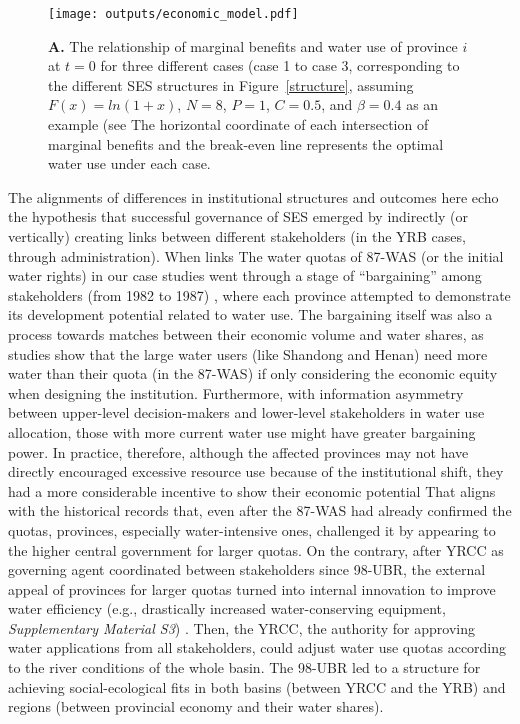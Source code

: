 \begin{figure}[!ht]
    \centering
    \texttt{[image: outputs/economic\_model.pdf]}
	\caption{
		\textbf{A.} The relationship of marginal benefits and water use of province $i$ at $t = 0$ for three different cases (case 1 to case 3, corresponding to the different SES structures in Figure~\ref{structure}, assuming $F(x)=ln(1+x)$, $N=8$, $P=1$, $C=0.5$, and $\beta=0.4$ as an example (see \textit{} The horizontal coordinate of each intersection of marginal benefits and the break-even line represents the optimal water use under each case.}
	\label{fig:model}
\end{figure}

The alignments of differences in institutional structures and outcomes here echo the hypothesis that successful governance of SES emerged by indirectly (or vertically) creating links between different stakeholders (in the YRB cases, through administration).
When links The water quotas of 87-WAS (or the initial water rights) in our case studies went through a stage of ``bargaining'' among stakeholders (from 1982 to 1987) \cite{wang2019a, wang2019d}, where each province attempted to demonstrate its development potential related to water use.
The bargaining itself was also a process towards matches between their economic volume and water shares, as studies show that the large water users (like Shandong and Henan) need more water than their quota (in the 87-WAS) if only considering the economic equity when designing the institution.
Furthermore, with information asymmetry between upper-level decision-makers and lower-level stakeholders in water use allocation, those with more current water use might have greater bargaining power.
In practice, therefore, although the affected provinces may not have directly encouraged excessive resource use because of the institutional shift, they had a more considerable incentive to show their economic potential
That aligns with the historical records that, even after the 87-WAS had already confirmed the quotas, provinces, especially water-intensive ones, challenged it by appearing to the higher central government for larger quotas.
On the contrary, after YRCC as governing agent coordinated between stakeholders since 98-UBR, the external appeal of provinces for larger quotas turned into internal innovation to improve water efficiency (e.g., drastically increased water-conserving equipment, \textit{Supplementary Material S3})
\cite{krieger1955, ostrom1990}.
Then, the YRCC, the authority for approving water applications from all stakeholders, could adjust water use quotas according to the river conditions of the whole basin.
The 98-UBR led to a structure for achieving social-ecological fits in both basins (between YRCC and the YRB) and regions (between provincial economy and their water shares).

